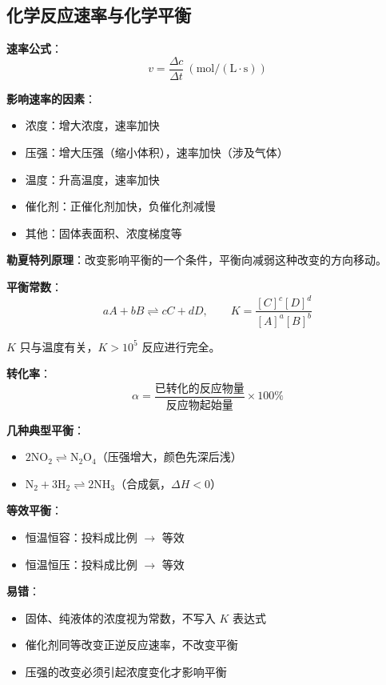 \subsection{化学反应速率与化学平衡}

\textbf{速率公式}：
\[
v = \frac{\Delta c}{\Delta t}\ (\text{mol}/(\text{L}\cdot\text{s}))
\]

\textbf{影响速率的因素}：
\begin{itemize}
  \item 浓度：增大浓度，速率加快
  \item 压强：增大压强（缩小体积），速率加快（涉及气体）
  \item 温度：升高温度，速率加快
  \item 催化剂：正催化剂加快，负催化剂减慢
  \item 其他：固体表面积、浓度梯度等
\end{itemize}

\textbf{勒夏特列原理}：改变影响平衡的一个条件，平衡向减弱这种改变的方向移动。

\textbf{平衡常数}：
\[
aA + bB \rightleftharpoons cC + dD,\qquad K = \frac{[C]^c[D]^d}{[A]^a[B]^b}
\]

$K$ 只与温度有关，$K>10^5$ 反应进行完全。

\textbf{转化率}：
\[
\alpha = \frac{\text{已转化的反应物量}}{\text{反应物起始量}} \times 100\%
\]

\textbf{几种典型平衡}：
\begin{itemize}
  \item $2\text{NO}_2 \rightleftharpoons \text{N}_2\text{O}_4$（压强增大，颜色先深后浅）
  \item $\text{N}_2 + 3\text{H}_2 \rightleftharpoons 2\text{NH}_3$（合成氨，$\Delta H<0$）
\end{itemize}

\textbf{等效平衡}：
\begin{itemize}
  \item 恒温恒容：投料成比例 $\to$ 等效
  \item 恒温恒压：投料成比例 $\to$ 等效
\end{itemize}

\textbf{易错}：
\begin{itemize}
  \item 固体、纯液体的浓度视为常数，不写入 $K$ 表达式
  \item 催化剂同等改变正逆反应速率，不改变平衡
  \item 压强的改变必须引起浓度变化才影响平衡
\end{itemize}

